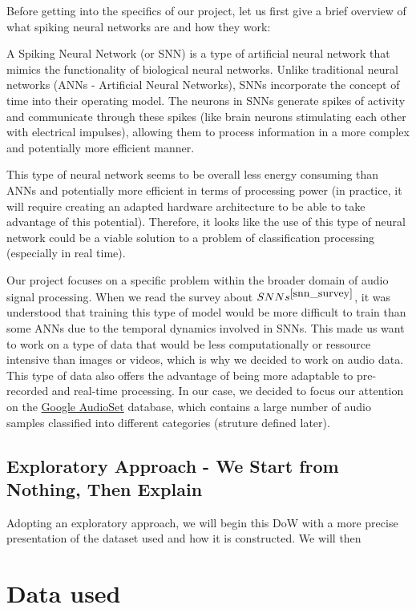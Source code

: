 \documentclass[11pt]{article}
\begin{document}
Before getting into the specifics of our project, let us first give a brief overview of what spiking neural networks are and how they work:

A Spiking Neural Network (or SNN) is a type of artificial neural network that mimics the functionality of biological neural networks. Unlike traditional neural networks (ANNs - Artificial Neural Networks), SNNs incorporate the concept of time into their operating model. The neurons in SNNs generate spikes of activity and communicate through these spikes (like brain neurons stimulating each other with electrical impulses), allowing them to process information in a more complex and potentially more efficient manner.

This type of neural network seems to be overall less energy consuming than ANNs and potentially more efficient in terms of processing power (in practice, it will require creating an adapted hardware architecture to be able to take advantage of this potential). Therefore, it looks like the use of this type of neural network could be a viable solution to a problem of classification processing (especially in real time).


Our project focuses on a specific problem within the broader domain of audio signal processing.
When we read the survey about $SNNs^{\cite{snn_survey}}$, it was understood that training this type of model would be more difficult to train than some ANNs due to the temporal dynamics involved in SNNs. This made us want to work on a type of data that would be less computationally or ressource intensive than images or videos, which is why we decided to work on audio data. This type of data also offers the advantage of being more adaptable to pre-recorded and real-time processing.
In our case, we decided to focus our attention on the \hyperref[item:google-audioset]{Google AudioSet} database, which contains a large number of audio samples classified into different categories (struture defined later). 

\subsection{Exploratory Approach - We Start from Nothing, Then Explain}

Adopting an exploratory approach, we will begin this DoW with a more precise presentation of the dataset used and how it is constructed.
We will then 


\section{Data used}
\end{document}

